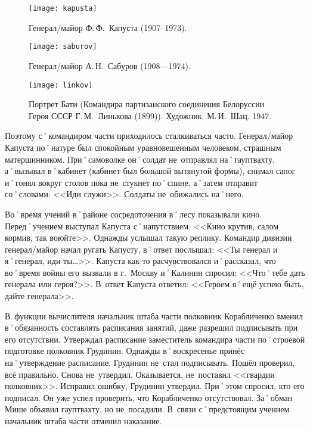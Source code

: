 \begin{figure}[h]
	\centering
	
	\begin{minipage}[h]{0.3\textwidth}			
		\texttt{[image: kapusta]}
		\caption{Генерал\-/майор Ф.\,Ф.~Капуста (1907--1973).}
		\label{fig:kapusta}		
	\end{minipage}	
	\hfill
	\begin{minipage}[h]{0.3\textwidth}			
		\texttt{[image: saburov]}
		\caption{Генерал\-/майор А.\,Н.~Сабуров (1908—1974).}
		\label{fig:saburov}
	\end{minipage}
	\hfill
	\begin{minipage}[h]{0.3\textwidth}		
		\texttt{[image: linkov]}
		\caption{Портрет Бати (Командира партизанского соединения Белоруссии Героя СССР Г.\,М.~Линькова (1899)). Художник: М.\,И.~Шац. 1947.}
		\label{fig:linkov}
	\end{minipage}
\end{figure}

Поэтому с˚командиром части приходилось сталкиваться часто. Генерал\-/майор Капуста по˚натуре был спокойным уравновешенным человеком, страшным матершинником. При˚самоволке он˚солдат не~отправлял на˚гауптвахту, а˚вызывал в˚кабинет (кабинет был большой вытянутой формы), снимал сапог и˚гонял вокруг столов пока не~стукнет по˚спине, а˚затем отправит со˚словами: <<Иди служи>>. Солдаты не~обижались на˚него.

Во˚время учений в˚районе сосредоточения в˚лесу показывали кино. Перед˚учением выступал Капуста с˚напутствием: <<Кино крутив, салом кормив, так воюйте>>. Однажды услышал такую реплику. Командир дивизии генерал\-/майор начал ругать Капусту, в˚ответ послышал: <<Ты генерал и я˚генерал, иди ты…>>. Капуста как-то расчувствовался и˚рассказал, что во˚время войны его вызвали в г.~Москву и˚Калинин спросил: <<Что˚тебе дать генерала или героя?>>. В~ответ Капуста ответил: <<Героем я˚ещё успею быть, дайте генерала>>. 

В~функции вычислителя начальник штаба части полковник Корабличенко вменил в˚обязанность составлять расписания занятий, даже разрешил подписывать при его отсутствии. Утверждал расписание заместитель командира части по˚строевой подготовке полковник Грудинин. Однажды в˚воскресенье принёс на˚утверждение расписание. Грудинин не~стал подписывать. Пошёл проверил, всё правильно. Снова не~утвердил. Оказывается, не~поставил <<гвардии полковник>>. Исправил ошибку, Грудинин утвердил. При˚этом спросил, кто его подписал. Он уже успел проверить, что Корабличенко отсутствовал. За˚обман Мише объявил гауптвахту, но не~посадили. В~связи с˚предстоящим учением начальник штаба части отменил наказание.

